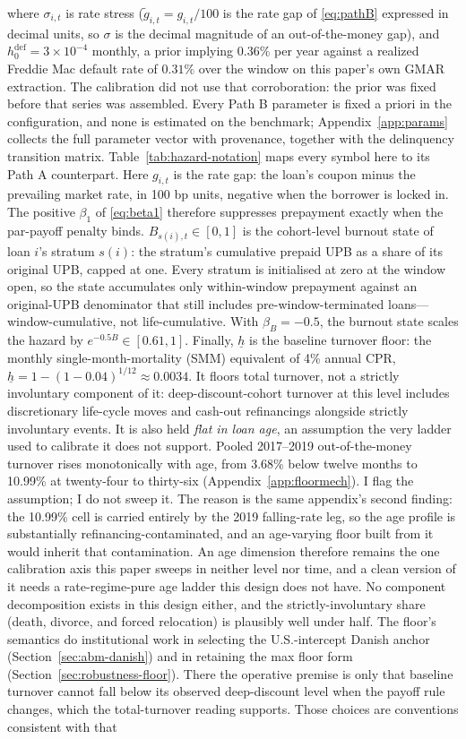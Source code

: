 \documentclass[12pt]{article}
\begin{document}
where $\sigma_{i,t}$ is rate stress ($\tilde g_{i,t} = g_{i,t}/100$ is the rate gap of \eqref{eq:pathB} expressed in decimal units, so $\sigma$ is the decimal magnitude of an out-of-the-money gap), and $h^{\mathrm{def}}_0 = 3\times10^{-4}$ monthly, a prior implying $0.36\%$ per year against a realized Freddie Mac default rate of $0.31\%$ over the window on this paper's own GMAR extraction. The calibration did not use that corroboration: the prior was fixed before that series was assembled. Every Path B parameter is fixed a priori in the configuration, and none is estimated on the benchmark; Appendix~\ref{app:params} collects the full parameter vector with provenance, together with the delinquency transition matrix. Table~\ref{tab:hazard-notation} maps every symbol here to its Path A counterpart. Here $g_{i,t}$ is the rate gap: the loan's coupon minus the prevailing market rate, in 100 bp units, negative when the borrower is locked in. The positive $\beta_1$ of \eqref{eq:beta1} therefore suppresses prepayment exactly when the par-payoff penalty binds. $B_{s(i),t} \in [0,1]$ is the cohort-level burnout state of loan $i$'s stratum $s(i)$: the stratum's cumulative prepaid UPB as a share of its original UPB, capped at one. Every stratum is initialised at zero at the window open, so the state accumulates only within-window prepayment against an original-UPB denominator that still includes pre-window-terminated loans---window-cumulative, not life-cumulative. With $\beta_B = -0.5$, the burnout state scales the hazard by $e^{-0.5 B} \in [0.61, 1]$. Finally, $\underline{h}$ is the baseline turnover floor: the monthly single-month-mortality (SMM) equivalent of 4\% annual CPR, $\underline{h} = 1-(1-0.04)^{1/12} \approx 0.0034$. It floors total turnover, not a strictly involuntary component of it: deep-discount-cohort turnover at this level includes discretionary life-cycle moves and cash-out refinancings alongside strictly involuntary events. It is also held \emph{flat in loan age}, an assumption the very ladder used to calibrate it does not support. Pooled 2017--2019 out-of-the-money turnover rises monotonically with age, from 3.68\% below twelve months to 10.99\% at twenty-four to thirty-six (Appendix~\ref{app:floormech}). I flag the assumption; I do not sweep it. The reason is the same appendix's second finding: the 10.99\% cell is carried entirely by the 2019 falling-rate leg, so the age profile is substantially refinancing-contaminated, and an age-varying floor built from it would inherit that contamination. An age dimension therefore remains the one calibration axis this paper sweeps in neither level nor time, and a clean version of it needs a rate-regime-pure age ladder this design does not have. No component decomposition exists in this design either, and the strictly-involuntary share (death, divorce, and forced relocation) is plausibly well under half. The floor's semantics do institutional work in selecting the U.S.-intercept Danish anchor (Section~\ref{sec:abm-danish}) and in retaining the max floor form (Section~\ref{sec:robustness-floor}). There the operative premise is only that baseline turnover cannot fall below its observed deep-discount level when the payoff rule changes, which the total-turnover reading supports. Those choices are conventions consistent with that 
\end{document}

